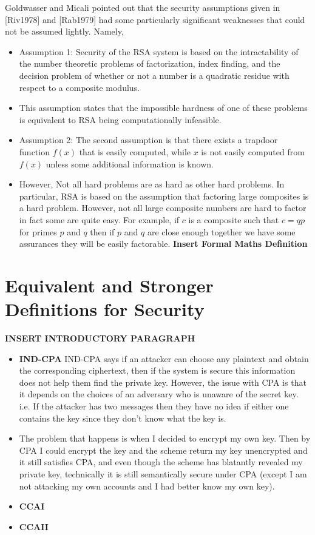 Goldwasser and Micali pointed out that the security assumptions given in [Riv1978] and [Rab1979] had some particularly significant weaknesses that could not be assumed lightly.
Namely,
\begin{itemize} 
\item Assumption 1: Security of the RSA system is based on the intractability of the number theoretic problems of factorization, index finding, and the decision problem of whether or not a number is a quadratic residue with respect to a composite modulus. 
\item This assumption states that the impossible hardness of one of these problems is
equivalent to RSA being computationally infeasible. 
\item Assumption 2: The second assumption is that there exists a trapdoor function $f(x)$ that is easily computed, while $x$ is not easily computed from $f(x)$ unless some additional information is known. 
\item However, Not all hard problems are as hard as other hard problems. In particular, RSA is based on the assumption that factoring large composites is a hard problem. However, not all large composite numbers are hard to factor in fact some are quite easy. For example, if $c$ is a composite such that $c=qp$ for primes $p$ and $q$ then if $p$ and $q$ are close enough together we have some assurances they will be easily factorable. \textbf{Insert Formal Maths Definition}
\end{itemize} 

\section{Equivalent and Stronger Definitions for Security} 

\textbf{INSERT INTRODUCTORY PARAGRAPH}

\begin{itemize}
\item \textbf{IND-CPA} IND-CPA says if an attacker can choose any plaintext and obtain the corresponding ciphertext, then if the system is secure this information does not help them find the private key. However, the issue with CPA is that it depends on the choices of an adversary who is unaware of the secret key. i.e. If the
attacker has two messages then they have no idea if either one contains the key since they don't know what the key is. 
\item The problem that happens is when I decided to encrypt my own key. Then by CPA I could encrypt the key and the scheme return my key unencrypted and it still satisfies
CPA, and even though the scheme has blatantly revealed my private key, technically it is still semantically secure under CPA (except I am not attacking my own accounts and I had better know my own key). 
\item \textbf{CCAI} 
\item \textbf{CCAII}
\end{itemize}

